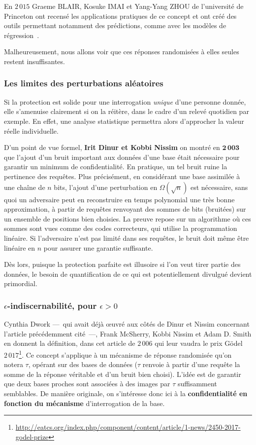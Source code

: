 \documentclass[a4paper,11pt]{article} %
\begin{document}
En $2\,015$ Graeme BLAIR, Kosuke IMAI et Yang-Yang ZHOU de l'université de Princeton ont recensé les applications pratiques de ce concept et ont créé des outils permettant notamment des prédictions, comme avec les modèles de régression~\cite{BIZ15}.

Malheureusement, nous allons voir que ces réponses randomisées à elles seules restent insuffisantes.
%
\subsubsection{Les limites des perturbations aléatoires}
%
Si la protection est solide pour une interrogation \emph{unique} d'une personne donnée, elle s'amenuise clairement si on la réitère, dans le cadre d'un relevé quotidien par exemple. 
En effet, une analyse statistique permettra alors d'approcher la valeur réelle individuelle.

D'un point de vue formel, \textbf{Irit Dinur et Kobbi Nissim} on montré en $\mathbf{2\,003}$~\cite{DN03} que l'ajout d'un bruit important aux données d'une base était nécessaire pour garantir un minimum de confidentialité. 
En pratique, un tel bruit ruine la pertinence des requêtes.
Plus précisément, en considérant une base assimilée à une chaîne de $n$ bits, l'ajout d'une perturbation en $\Omega(\sqrt{n})$ est nécessaire, sans quoi un adversaire peut en reconstruire en temps polynomial une très bonne approximation, à partir de requêtes renvoyant des sommes de bits (bruitées) sur un ensemble de positions bien choisies. 
La preuve repose sur un algorithme où ces sommes sont vues comme des codes correcteurs, qui utilise la programmation linéaire.
Si l'adversaire n'est pas limité dans ses requêtes, le bruit doit même être linéaire en $n$ pour assurer une garantie suffisante.

Dès lors, puisque la protection parfaite est illusoire si l'on veut tirer partie des données, le besoin de quantification de ce qui est potentiellement divulgué devient primordial.
%
\subsubsection{$\epsilon$-indiscernabilité, pour $\epsilon>0$}%
Cynthia Dwork ---~qui avait déjà œuvré aux côtés de Dinur et Nissim concernant l'article précédemment cité~---, Frank McSherry, Kobbi Nissim et Adam D. Smith en donnent la définition, dans cet article de $2\,006$\cite{DMNS06} qui leur vaudra le prix Gödel $2\,017$\footnote{\url{http://eatcs.org/index.php/component/content/article/1-news/2450-2017-godel-prize}}.
Ce concept s'applique à un mécanisme de réponse randomisée qu'on notera $\tau$, opérant sur des bases de données ($\tau$ renvoie à partir d'une requête la somme de la réponse véritable et d'un \og bruit\fg{} bien choisi). 
L'idée est de garantir que deux bases proches sont associées à des images par $\tau$ suffisamment semblables. 
De manière originale, on s'intéresse donc ici à la \textbf{confidentialité en fonction du mécanisme} d'interrogation de la base. 
\end{document}
